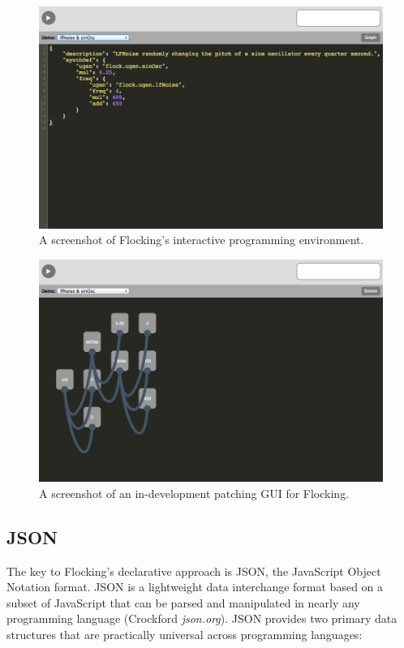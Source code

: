 \documentclass{article}
\begin{document}
\begin{figure}[h]
\centering
\includegraphics[width=0.9\columnwidth]{images/flocking-playground-source-view.png}
\caption{ A screenshot of Flocking's interactive programming environment.\label{fig:playground}}
\end{figure}

\begin{figure}[h]
\centering
\includegraphics[width=0.9\columnwidth]{images/flocking-playground-graphical-view.png}
\caption{ A screenshot of an in-development patching GUI for Flocking.\label{fig:graphical}}
\end{figure}


\subsection{JSON}

The key to Flocking's declarative approach is JSON, the JavaScript Object Notation format. JSON is a lightweight data interchange format based on a subset of JavaScript that can be parsed and manipulated in nearly any programming language (Crockford {\it json.org}). JSON provides two primary data structures that are practically universal across programming languages:
\end{document}
